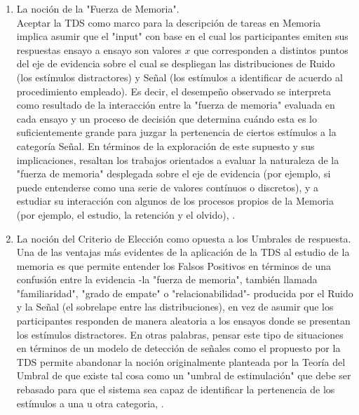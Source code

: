 \begin{enumerate}
\item La noción de la "Fuerza de Memoria".\\

Aceptar la TDS como marco para la descripción de tareas en Memoria implica asumir que el "input" con base en el cual los participantes emiten sus respuestas ensayo a ensayo son valores $x$ que corresponden a distintos puntos del eje de evidencia sobre el cual se despliegan las distribuciones de Ruido (los estímulos distractores) y Señal (los estímulos a identificar de acuerdo al procedimiento empleado). Es decir, el desempeño observado se interpreta como resultado de la interacción entre la "fuerza de memoria" evaluada en cada ensayo y un proceso de decisión que determina cuándo esta es lo suficientemente grande para juzgar la pertenencia de ciertos estímulos a la categoría Señal. En términos de la exploración de este supuesto y sus implicaciones, resaltan los trabajos orientados a evaluar la naturaleza de la "fuerza de memoria" desplegada sobre el eje de evidencia (por ejemplo, si puede entenderse como una serie de valores contínuos o discretos), y a estudiar su interacción con algunos de los procesos propios de la Memoria (por ejemplo, el estudio, la retención y el olvido), \parencite{Bernbach1967, Wickelgren1966, Parks1966}.\\

\item La noción del Criterio de Elección como opuesta a los Umbrales de respuesta.\\

Una de las ventajas más evidentes de la aplicación de la TDS al estudio de la memoria es que permite entender los Falsos Positivos en términos de una confusión entre la evidencia -la "fuerza de memoria", también llamada "familiaridad", "grado de empate" o "relacionabilidad"- producida por el Ruido y la Señal (el sobrelape entre las distribuciones), en vez de asumir que los participantes responden de manera aleatoria a los ensayos donde se presentan los estímulos distractores. En otras palabras, pensar este tipo de situaciones en términos de un modelo de detección de señales como el propuesto por la TDS permite abandonar la noción originalmente planteada por la Teoría del Umbral de que existe tal cosa como un "umbral de estimulación" que debe ser rebasado para que el sistema sea capaz de identificar la pertenencia de los estímulos a una u otra categoria, \parencite{Yonelinas1996}.\\
 

\end{enumerate}
